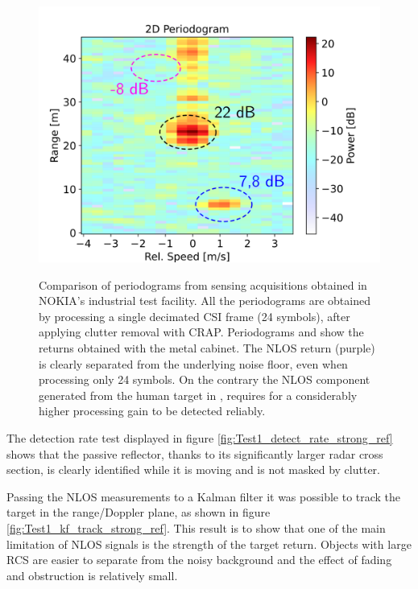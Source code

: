 \begin{figure}[H]
{		\includegraphics[scale=0.45]{Images/Test1/per_strong_ref/db_1frame_dec_CRAP_HUMAN_labelled_text22.png}
	}
	\caption[]{\small Comparison of periodograms from sensing acquisitions obtained in NOKIA's industrial test facility.
		All the periodograms are obtained by processing a single decimated CSI frame (24 symbols), after applying clutter removal with CRAP.
		Periodograms  and  show the returns obtained with the metal cabinet. The NLOS return (purple) is clearly separated from the underlying noise floor, even when processing only 24 symbols. On the contrary the NLOS component generated from the human target in , requires for a considerably higher processing gain to be detected reliably.}
	\label{fig:Test1_metal-human_comparison}
	\end{figure}


The detection rate test displayed in figure \ref{fig:Test1_detect_rate_strong_ref} shows that the passive reflector, thanks to its significantly larger radar cross section, is clearly identified while it is moving and is not masked by clutter.

Passing the NLOS measurements to a Kalman filter it was possible to track the target in the range/Doppler plane, as shown in figure \ref{fig:Test1_kf_track_strong_ref}. This result is to show that one of the main limitation of NLOS signals is the strength of the target return. Objects with large RCS are easier to separate from the noisy background and the effect of fading and obstruction is relatively small.

